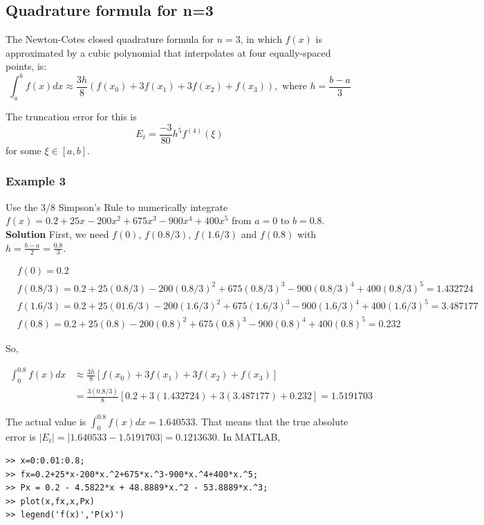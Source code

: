 \documentclass [titlepage,12pt,letter] {article}
\begin{document}
\subsection{Quadrature formula for n=3} 

The Newton-Cotes closed quadrature formula for $n=3$, in which $f(x)$
is approximated by a cubic polynomial that interpolates at four
equally-spaced points, is:
\[
\int_{a}^{b} f(x)dx \approx \frac{3h}{8} (f(x_0) + 3 f(x_1) + 3 f(x_2) + f(x_3)), 
\mbox { where } h = \frac{b-a}{3}
\]

The truncation error for this is
\[
E_t=\frac{-3}{80}h^5f^{(4)}(\xi)
\]
\noindent
for some $\xi \in [a,b]$.

\subsubsection{Example 3} 

Use the 3/8 Simpson's Rule to numerically integrate $f(x)=0.2+25x-200x^2+675x^3-900x^4+400x^5$ from $a=0$ to $b=0.8$. \\

{\bf Solution}
First, we need $f(0)$, $f(0.8/3)$, $f(1.6/3)$ and $f(0.8)$ with $h=\frac{b-a}{2}=\frac{0.8}{3}$.

\begin{align*}
&f(0)=0.2 \\
&f(0.8/3)=0.2+25(0.8/3)-200(0.8/3)^2+675(0.8/3)^3-900(0.8/3)^4+400(0.8/3)^5 = 1.432724 \\
&f(1.6/3)=0.2+25(01.6/3)-200(1.6/3)^2+675(1.6/3)^3-900(1.6/3)^4+400(1.6/3)^5 = 3.487177 \\
&f(0.8)=0.2+25(0.8)-200(0.8)^2+675(0.8)^3-900(0.8)^4+400(0.8)^5 = 0.232
\end{align*}

So,

\begin{align*}
\int_0^{0.8}f(x)dx &\approx \frac{3h}{8}[f(x_0)+3f(x_1)+3f(x_2)+f(x_3)] \\
&= \frac{3(0.8/3)}{8}[0.2+3(1.432724)+3(3.487177)+0.232] = 1.5191703
\end{align*}

The actual value is $\int_0^{0.8}f(x)dx=1.640533$. That means that the true absolute error is $|E_t|=|1.640533-1.5191703|=0.1213630$. In MATLAB,

\begin{verbatim}
>> x=0:0.01:0.8;
>> fx=0.2+25*x-200*x.^2+675*x.^3-900*x.^4+400*x.^5;
>> Px = 0.2 - 4.5822*x + 48.8889*x.^2 - 53.8889*x.^3;
>> plot(x,fx,x,Px)
>> legend('f(x)','P(x)')
\end{verbatim}
\end{document}
